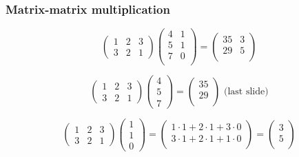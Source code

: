 \documentclass{beamer}
\begin{document}
\begin{frame}
\frametitle{Matrix-matrix multiplication}

\[
\begin{pmatrix}
1 & 2 & 3  \\
3 & 2 & 1
\end{pmatrix}
\begin{pmatrix}
4 & 1 \\ 5 & 1 \\ 7 & 0 \\
\end{pmatrix}
= \begin{pmatrix}
35 & 3 \\ 29 & 5 \\
\end{pmatrix}
\]

\[
\begin{pmatrix}
1 & 2 & 3  \\
3 & 2 & 1
\end{pmatrix}
\begin{pmatrix}
4 \\ 5 \\ 7
\end{pmatrix}
= \begin{pmatrix}
35 \\
29 \\
\end{pmatrix} \text{ (last slide)}
\]

\[
\begin{pmatrix}
1 & 2 & 3  \\
3 & 2 & 1
\end{pmatrix}
\begin{pmatrix}
1 \\ 1 \\ 0
\end{pmatrix}
= \begin{pmatrix}
1 \cdot 1 + 2 \cdot 1 + 3 \cdot 0 \\
3 \cdot 1 + 2 \cdot 1 + 1 \cdot 0 \\
\end{pmatrix}
= \begin{pmatrix}
3 \\
5 \\
\end{pmatrix}
\]


\end{frame}
\end{document}
